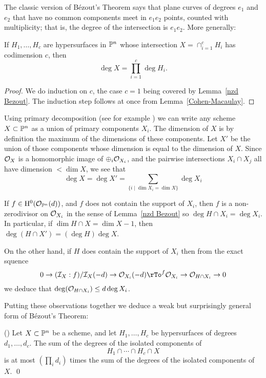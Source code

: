 \documentclass[12pt, leqno]{book}
\begin{document}
The classic version of B\'ezout's Theorem says that plane curves of degrees $e_{1}$ and $e_{2}$ that
have no common components meet in $e_{1}e_{2}$ points, counted with multiplicity; that is, the degree of the 
intersection is $e_{1}e_{2}$.
More generally:

\begin{corollary}\label{classic Bezout}
 If $H_{1}, \dots, H_{c}$ are hypersurfaces in $\PP^{n}$ whose intersection
 $X = \cap_{i=1}^{c}H_{i}$ has codimension $c$, then 
 $$
 \deg X = \prod_{i=1}^{c}\deg H_{i}.
 $$
\end{corollary}
\begin{proof}
We do induction on $c$, the case $c=1$ being covered by Lemma~\ref{nzd Bezout}. The induction step
follows at once from Lemma~\ref{Cohen-Macaulay}.
\end{proof}


Using primary decomposition (see for example \cite[Section II.3.3]{GeomSchemes}) we can write any
scheme $X\subset \PP^{n}$ as a union of primary components $X_{i}$. The dimension of $X$ is
by definition the maximum of the dimensions of these components. Let $X'$ be the union of those
components whose dimension is equal to the dimension of $X$. Since $\cO_{X}$ is a homomorphic image of
$\oplus_{i}\cO_{X_{i}}$, and the pairwise intersections $X_{i}\cap X_{j}$ all have dimension $<\dim X$, 
we see that 
$$
\deg X = \deg X' = \sum_{\{i\mid \dim X_{i} = \dim X\}}\deg X_{i}
$$

If $f \in \HH^{0}(\cO_{\PP^{n}}(d))$, and $f$ does not contain the support of $X_{i}$, then
$f$ is a non-zerodivisor on $\cO_{X_{i}}$ in the sense of
Lemma~\ref{nzd Bezout} so $\deg H\cap X_{i} = \deg X_{i}$. 
In particular, if $\dim H\cap X = \dim X -1$, then
$\deg(H\cap X') = (\deg H)\deg X$. 

On the other hand, if $H$ does contain the
support of $X_{i}$ then from the exact squence
$$
0\to (\cI_{X}:f)/\cI_{X}(-d) \to \cO_{X_{i}}(-d) \rTo^{f} \cO_{X_{i}} \to \cO_{H\cap X_{i}} \to 0
$$
we deduce that $\deg (\cO_{H\cap X_{i}}) \leq d\deg X_{i}$.

Putting these observations together we deduce a weak but surprisingly general form of B\'ezout's Theorem:

\begin{proposition}(\cite[Exericse 8.4.6]{Fulton})\label {weak Bezout}
Let $X\subset \PP^{n}$ be a scheme, and let $H_{1}, \dots, H_{c}$ be hypersurfaces of degrees $d_{1}, \dots, d_{c}$.
The sum of the degrees of the isolated components of 
$$
H_{1}\cap\cdots\cap H_{c}\cap X
$$
is at most $(\prod_{i}d_{i})$ times the sum of the degrees of the isolated components of $X$. \qed
\end{proposition}
\end{document}
